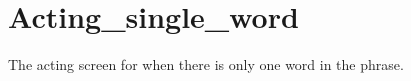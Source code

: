 \section{Acting\_single\_word}
\begin{figure}[h!]
\end{figure}
The acting screen for when there is only one word in the phrase.

\newpage

